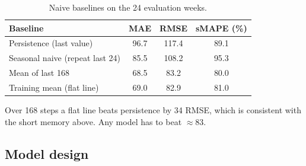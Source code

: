 \begin{table}[H]\centering\small
\caption{Naive baselines on the 24 evaluation weeks.}
\label{tab:t2base}
\begin{tabular}{lccc}
\toprule
Baseline & MAE & RMSE & sMAPE (\%)\\
\midrule
Persistence (last value) & 96.7 & 117.4 & 89.1\\
Seasonal naive (repeat last 24) & 85.5 & 108.2 & 95.3\\
Mean of last 168 & 68.5 & 83.2 & 80.0\\
Training mean (flat line) & 69.0 & 82.9 & 81.0\\
\bottomrule
\end{tabular}
\end{table}
\noindent Over 168 steps a flat line beats persistence by 34 RMSE, which is consistent with the short memory above. Any model has to beat $\approx$83.

\subsection*{Model design}

